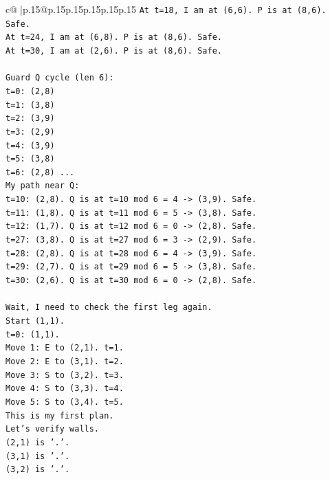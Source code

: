 \documentclass{article}
\begin{document}
{\begin{supertabular}{c@{$\;$}|p{.15\linewidth}@{}p{.15\linewidth}p{.15\linewidth}p{.15\linewidth}p{.15\linewidth}p{.15\linewidth}}
{{{\texttt{At t=18, I am at (6,6). P is at (8,6). Safe.} \\
\texttt{At t=24, I am at (6,8). P is at (8,6). Safe.} \\
\texttt{At t=30, I am at (2,6). P is at (8,6). Safe.} \\
\\ 
\texttt{Guard Q cycle (len 6):} \\
\texttt{t=0: (2,8)} \\
\texttt{t=1: (3,8)} \\
\texttt{t=2: (3,9)} \\
\texttt{t=3: (2,9)} \\
\texttt{t=4: (3,9)} \\
\texttt{t=5: (3,8)} \\
\texttt{t=6: (2,8) ...} \\
\texttt{My path near Q:} \\
\texttt{t=10: (2,8). Q is at t=10 mod 6 = 4 {-}> (3,9). Safe.} \\
\texttt{t=11: (1,8). Q is at t=11 mod 6 = 5 {-}> (3,8). Safe.} \\
\texttt{t=12: (1,7). Q is at t=12 mod 6 = 0 {-}> (2,8). Safe.} \\
\texttt{t=27: (3,8). Q is at t=27 mod 6 = 3 {-}> (2,9). Safe.} \\
\texttt{t=28: (2,8). Q is at t=28 mod 6 = 4 {-}> (3,9). Safe.} \\
\texttt{t=29: (2,7). Q is at t=29 mod 6 = 5 {-}> (3,8). Safe.} \\
\texttt{t=30: (2,6). Q is at t=30 mod 6 = 0 {-}> (2,8). Safe.} \\
\\ 
\texttt{Wait, I need to check the first leg again.} \\
\texttt{Start (1,1).} \\
\texttt{t=0: (1,1).} \\
\texttt{Move 1: E to (2,1). t=1.} \\
\texttt{Move 2: E to (3,1). t=2.} \\
\texttt{Move 3: S to (3,2). t=3.} \\
\texttt{Move 4: S to (3,3). t=4.} \\
\texttt{Move 5: S to (3,4). t=5.} \\
\texttt{This is my first plan.} \\
\texttt{Let's verify walls.} \\
\texttt{(2,1) is '.'.} \\
\texttt{(3,1) is '.'.} \\
\texttt{(3,2) is '.'.} \\
}}}
\end{supertabular}}
\end{document}
